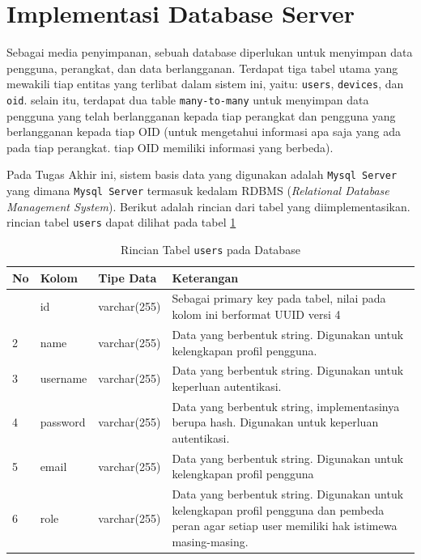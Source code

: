     \section{Implementasi Database Server}
    	Sebagai media penyimpanan, sebuah database diperlukan untuk menyimpan data pengguna, perangkat, dan data berlangganan. Terdapat tiga tabel utama yang mewakili tiap entitas yang terlibat dalam sistem ini, yaitu: \texttt{users}, \texttt{devices}, dan \texttt{oid}. selain itu, terdapat dua table \texttt{many-to-many} untuk menyimpan data pengguna yang telah berlangganan kepada tiap perangkat dan pengguna yang berlangganan kepada tiap OID (untuk mengetahui informasi apa saja yang ada pada tiap perangkat. tiap OID memiliki informasi yang berbeda).
    	
    	Pada Tugas Akhir ini, sistem basis data yang digunakan adalah \texttt{Mysql Server} yang dimana \texttt{Mysql Server} termasuk kedalam RDBMS (\textit{Relational Database Management System}). Berikut adalah rincian dari tabel yang diimplementasikan. rincian tabel \texttt{users} dapat dilihat pada tabel \ref{tabeldbusers}
    	
    	\begin{longtable}{|p{}|p{}|p{}|p{}|} %
    		
    		\caption{Rincian Tabel \texttt{users} pada Database} \label{tabeldbusers} \\
    		\hline
    		\textbf{No} & \textbf{Kolom} & \textbf{Tipe Data} & \textbf{Keterangan} \\ \hline
    		\endhead
    		\endfoot
    		\endlastfoot
    		1 & id & varchar(255) & Sebagai primary key pada tabel, nilai pada kolom ini berformat UUID versi 4 \\ \hline
    		2 & name & varchar(255) & Data yang berbentuk string. Digunakan untuk kelengkapan profil pengguna. \\ \hline
    		3 & username & varchar(255) & Data yang berbentuk string. Digunakan untuk keperluan autentikasi. \\ \hline
    		4 & password & varchar(255) & Data yang berbentuk string, implementasinya berupa hash. Digunakan untuk keperluan autentikasi. \\ \hline
    		5 & email & varchar(255) & Data yang berbentuk string. Digunakan untuk kelengkapan profil pengguna \\ \hline
    		6 & role & varchar(255) & Data yang berbentuk string. Digunakan untuk kelengkapan profil pengguna dan pembeda peran agar setiap user memiliki hak istimewa masing-masing. \\ \hline
    	\end{longtable}
    	
